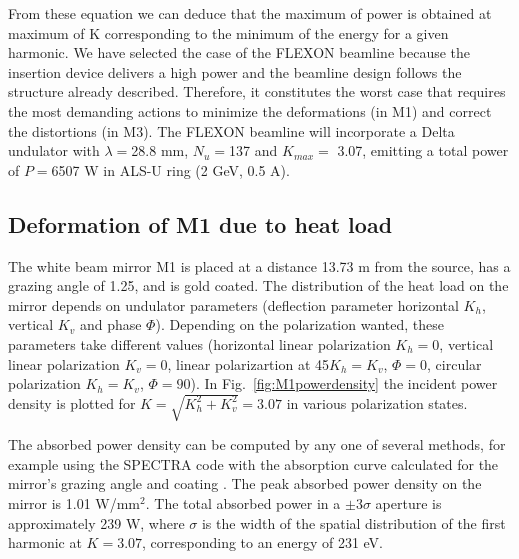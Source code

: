 \documentclass{iucr}              %
\newcommand{\todo}[1]{{\color{red}[TODO: "#1'']}}
\begin{document}
From these equation we can deduce that the maximum of power is obtained at maximum of K corresponding to the minimum of the energy for a given harmonic.  We have selected the case of the FLEXON beamline because the insertion device delivers a high power and the beamline design follows the structure already described. Therefore, it constitutes the worst case that requires the most demanding actions to minimize the deformations (in M1) and correct the distortions (in M3). The FLEXON beamline will incorporate a Delta undulator \cite{deltaundulator} with $\lambda=$28.8 mm, $N_u=$137 and $K_{max}=$ 3.07, emitting a total power of $P=$6507 W in ALS-U ring (2 GeV,  0.5 A).

\subsection{Deformation of M1 due to heat load}


The white beam mirror M1 is placed at a distance 13.73 m from the source, has a grazing angle of 1.25\textdegree, and is gold coated. The distribution of the heat load on the mirror depends on undulator parameters (deflection parameter horizontal $K_h$, vertical $K_v$ and phase $\Phi$). Depending on the polarization wanted, these parameters take different values (horizontal linear polarization $K_h=0$, vertical linear polarization $K_v=0$, linear polarizartion at 45\textdegree $K_h=K_v$, $\Phi=0$, circular polarization $K_h=K_v$, $\Phi=90$\textdegree ). In Fig.~\ref{fig:M1powerdensity} the incident power density is plotted for $K=\sqrt{K_h^2 + K_v^2}=3.07$ in various polarization states.

The absorbed power density can be computed by any one of several methods, for example using the SPECTRA code with the absorption curve calculated for the mirror's grazing angle and coating \cite{codeSPECTRA}.  The peak absorbed power density on the mirror is 1.01 W/mm$^2$. The total absorbed power in a $\pm 3 \sigma$ aperture is approximately 239 W, where $\sigma$ is the width of the spatial distribution of the first harmonic at $K=3.07$, corresponding to an energy of 231 eV.
\end{document}
